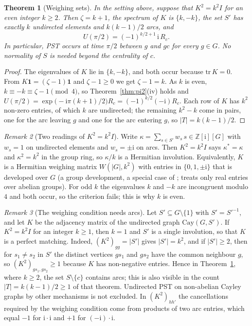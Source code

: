 \documentclass[preprint,11pt]{elsarticle}
\newtheorem{theorem}{Theorem}[section]
\theoremstyle{definition}
\theoremstyle{remark}
\newtheorem{remark}[theorem]{Remark}
\newcommand{\Z}{\mathbb Z}
\newcommand{\ii}{\mathrm i}
\begin{document}
\begin{theorem}[Weighing sets]\label{thm:weighing}
In the setting above, suppose that $K^2=k^2I$ for an even integer $k\ge2$. Then $\zeta=k+1$, the spectrum of $K$ is $\{k,-k\}$, the set $S'$ has exactly $k$ undirected elements and $k(k-1)/2$ arcs, and
\[
U(\pi/2)=(-1)^{k/2+1}\,\ii\,R_c .
\]
In particular, PST occurs at time $\pi/2$ between $g$ and $gc$ for every $g\in G$. No normality of $S$ is needed beyond the centrality of $c$.
\end{theorem}
\begin{proof}
The eigenvalues of $K$ lie in $\{k,-k\}$, and both occur because $\mathrm{tr}\,K=0$. From $K\mathbf 1=(\zeta-1)\mathbf 1$ and $\zeta-1\ge0$ we get $\zeta-1=k$. As $k$ is even, $k\equiv-k\equiv\zeta-1\pmod4$, so Theorem~\ref{thm:pi2}(iv) holds and $U(\pi/2)=\exp\bigl(-\ii\pi(k+1)/2\bigr)R_c=(-1)^{k/2}(-\ii)R_c$. Each row of $K$ has $k^2$ non-zero entries, of which $k$ are undirected; the remaining $k^2-k$ come in pairs, one for the arc leaving $g$ and one for the arc entering $g$, so $|T|=k(k-1)/2$.
\end{proof}

\begin{remark}[Two readings of $K^2=k^2I$]\label{rem:reading}
Write $\kappa=\sum_{s\in S'}w_s\,s\in\Z[\ii][G]$ with $w_s=1$ on undirected elements and $w_s=\pm\ii$ on arcs. Then $K^2=k^2I$ says $\kappa^*=\kappa$ and $\kappa^2=k^2$ in the group ring, so $\kappa/k$ is a Hermitian involution. Equivalently, $K$ is a Hermitian weighing matrix $W(|G|,k^2)$ with entries in $\{0,1,\pm\ii\}$ that is developed over $G$ (a group development, a special case of \cite{GD}; \cite{AH} treats only real entries over abelian groups). For odd $k$ the eigenvalues $k$ and $-k$ are incongruent modulo $4$ and both occur, so the criterion fails; this is why $k$ is even.
\end{remark}

\begin{remark}[The weighing condition needs arcs]\label{rem:mixedonly}
Let $S'\subseteq G\setminus\{1\}$ with $S'=S'^{-1}$, and let $K$ be the adjacency matrix of the undirected graph $\mathrm{Cay}(G,S')$. If $K^2=k^2I$ for an integer $k\ge1$, then $k=1$ and $S'$ is a single involution, so that $K$ is a perfect matching. Indeed, $(K^2)_{gg}=|S'|$ gives $|S'|=k^2$, and if $|S'|\ge2$, then for $s_1\ne s_2$ in $S'$ the distinct vertices $gs_1$ and $gs_2$ have the common neighbour $g$, so $(K^2)_{gs_1,gs_2}\ge1$ because $K$ has non-negative entries. Hence in Theorem~\ref{thm:weighing}, where $k\ge2$, the set $S\setminus\{c\}$ contains arcs; this is also visible in the count $|T|=k(k-1)/2\ge1$ of that theorem. Undirected PST on non-abelian Cayley graphs by other mechanisms is not excluded. In $(K^2)_{hh'}$ the cancellations required by the weighing condition come from products of two arc entries, which equal $-1$ for $\ii\cdot\ii$ and $+1$ for $(-\ii)\cdot\ii$.
\end{remark}
\end{document}
